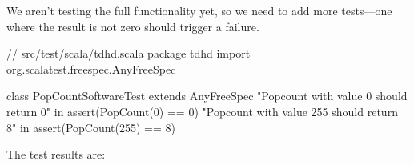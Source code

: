 \documentclass{tufte-book}
\begin{document}
\vspace{5\baselineskip}\vspace{-5\baselineskip}%
\inputminted[style=ansi,fontsize=\scriptsize,linenos,bgcolor=LightGray,frame=lines,framesep=2mm,baselinestretch=1.2]{ansi-terminal}{../chisel/pass.ansi-txt}%
We aren't testing the full functionality yet, so we need to add more tests---one where the result is not zero should trigger a failure.
\begin{scalacode}
// src/test/scala/tdhd.scala
package tdhd
import org.scalatest.freespec.AnyFreeSpec

class PopCountSoftwareTest extends AnyFreeSpec {
  "Popcount with value 0 should return 0" in {
    assert(PopCount(0) == 0)
  }
  "Popcount with value 255 should return 8" in {
    assert(PopCount(255) == 8)
  }
}
\end{scalacode}
The test results are:
\vspace{7\baselineskip}\vspace{-7\baselineskip}%
\inputminted[style=ansi,fontsize=\scriptsize,linenos,bgcolor=LightGray,frame=lines,framesep=2mm,baselinestretch=1.2]{ansi-terminal}{../chisel/fail3.ansi-txt}%
\end{document}
